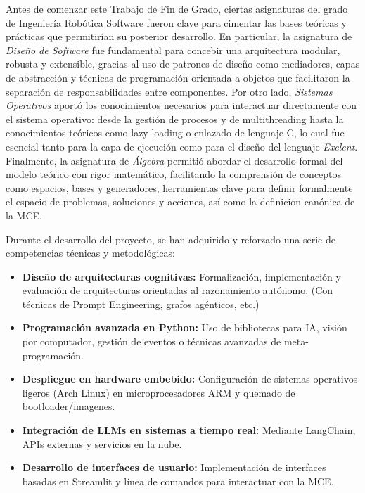 Antes de comenzar este Trabajo de Fin de Grado, ciertas asignaturas del grado de
Ingeniería Robótica Software fueron clave para cimentar las bases teóricas y
prácticas que permitirían su posterior desarrollo. En particular, la asignatura
de \emph{Diseño de Software} fue fundamental para concebir una arquitectura
modular, robusta y extensible, gracias al uso de patrones de diseño como
mediadores, capas de abstracción y técnicas de programación orientada a objetos
que facilitaron la separación de responsabilidades entre componentes. Por otro lado,
\emph{Sistemas Operativos} aportó los conocimientos necesarios para
interactuar directamente con el sistema operativo: desde la gestión de procesos
y de multithreading hasta la conocimientos teóricos como lazy loading o enlazado de lenguaje C,
lo cual fue esencial tanto para la capa de ejecución como para el diseño del lenguaje
\textit{Exelent}. Finalmente, la asignatura de \emph{Álgebra} permitió 
abordar el desarrollo formal del modelo teórico con rigor matemático, 
facilitando la comprensión de conceptos como espacios, bases y generadores, 
herramientas clave para definir formalmente el espacio de problemas, soluciones y 
acciones, así como la definicion canónica de la MCE.

Durante el desarrollo del proyecto, se han adquirido y reforzado una serie de
competencias técnicas y metodológicas:

\begin{itemize}
    \item \textbf{Diseño de arquitecturas cognitivas:} Formalización, implementación y 
    evaluación de arquitecturas orientadas al razonamiento autónomo. (Con técnicas de
    Prompt Engineering, grafos agénticos, etc.)
    \item \textbf{Programación avanzada en Python:} Uso de
    bibliotecas para IA, visión por computador, gestión de eventos o técnicas
    avanzadas de meta-programación.
    \item \textbf{Despliegue en hardware embebido:} Configuración de sistemas
    operativos ligeros (Arch Linux) en microprocesadores ARM y quemado de bootloader/imagenes.
    \item \textbf{Integración de LLMs en sistemas a tiempo real:} Mediante LangChain, APIs
    externas y servicios en la nube.
    \item \textbf{Desarrollo de interfaces de usuario:} Implementación de interfaces
    basadas en Streamlit y línea de comandos para interactuar con la MCE.
\end{itemize}


